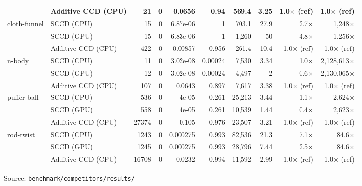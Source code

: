 \begin{table}[htbp]
{\begin{tabular}{llrrrrrrrr}
     & Additive CCD (CPU) & 21 & 0 & 0.0656 & 0.94 & 569.4 & 3.25 & 1.0$\times$ (ref) & 1.0$\times$ (ref) \\
    \midrule
    cloth-funnel & SCCD (CPU) & 15 & 0 & 6.87e-06 & 1 & 703.1 & 27.9 & 2.7$\times$ & 1,248$\times$ \\
     & SCCD (GPU) & 15 & 0 & 6.83e-06 & 1 & 1,260 & 50 & 4.8$\times$ & 1,256$\times$ \\
     & Additive CCD (CPU) & 422 & 0 & 0.00857 & 0.956 & 261.4 & 10.4 & 1.0$\times$ (ref) & 1.0$\times$ (ref) \\
    \midrule
    n-body & SCCD (CPU) & 11 & 0 & 3.02e-08 & 0.00024 & 7,530 & 3.34 & 1.0$\times$ & 2,128,613$\times$ \\
     & SCCD (GPU) & 12 & 0 & 3.02e-08 & 0.00024 & 4,497 & 2 & 0.6$\times$ & 2,130,065$\times$ \\
     & Additive CCD (CPU) & 107 & 0 & 0.0643 & 0.897 & 7,617 & 3.38 & 1.0$\times$ (ref) & 1.0$\times$ (ref) \\
    \midrule
    puffer-ball & SCCD (CPU) & 536 & 0 & 4e-05 & 0.261 & 25,213 & 3.44 & 1.1$\times$ & 2,624$\times$ \\
     & SCCD (GPU) & 558 & 0 & 4e-05 & 0.261 & 10,539 & 1.44 & 0.4$\times$ & 2,623$\times$ \\
     & Additive CCD (CPU) & 27374 & 0 & 0.105 & 0.976 & 23,507 & 3.21 & 1.0$\times$ (ref) & 1.0$\times$ (ref) \\
    \midrule
    rod-twist & SCCD (CPU) & 1243 & 0 & 0.000275 & 0.993 & 82,536 & 21.3 & 7.1$\times$ & 84.6$\times$ \\
     & SCCD (GPU) & 1245 & 0 & 0.000275 & 0.993 & 28,796 & 7.44 & 2.5$\times$ & 84.6$\times$ \\
     & Additive CCD (CPU) & 16708 & 0 & 0.0232 & 0.994 & 11,592 & 2.99 & 1.0$\times$ (ref) & 1.0$\times$ (ref) \\
    \bottomrule
  \end{tabular}}
  \par\smallskip\footnotesize Source: \texttt{benchmark/competitors/results/}
\end{table}
